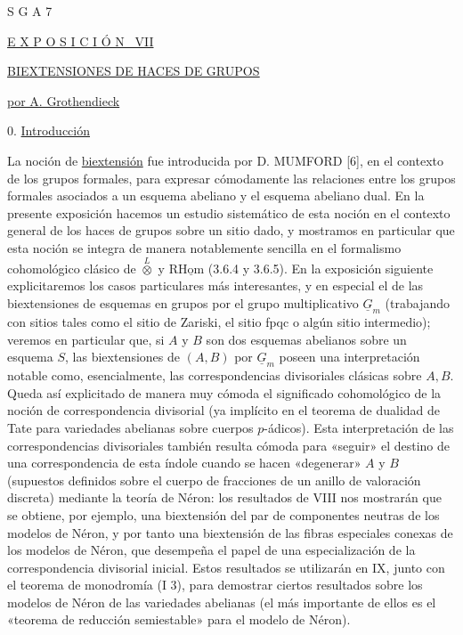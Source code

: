 


S G A 7


\underline{E X P O S I C I Ó N \ VII}


\underline{\underline{BIEXTENSIONES DE HACES DE GRUPOS}}


\underline{por A. Grothendieck}


0. \underline{Introducción}

La noción de \underline{biextensión} fue introducida por D. MUMFORD
[6], en el contexto de los grupos formales, para expresar cómodamente
las relaciones entre los grupos formales asociados a un esquema
abeliano y el esquema abeliano dual. En la presente exposición hacemos
un estudio sistemático de esta noción en el contexto general de los
haces de grupos sobre un sitio dado, y mostramos en particular que esta
noción se integra de manera notablemente sencilla en el formalismo
cohomológico clásico de $\overset{L}{\otimes}$ y
$\mathrm{R}\underline{\mathrm{Hom}}$ (3.6.4 y 3.6.5). En la exposición siguiente
explicitaremos los casos particulares más interesantes, y en especial
el de las biextensiones de esquemas en grupos por el grupo multiplicativo
$\underline{G}_{m}$ (trabajando con sitios tales como el sitio de
Zariski, el sitio fpqc o algún sitio intermedio); veremos en particular
que, si $A$ y $B$ son dos esquemas abelianos sobre un esquema $S$, las
biextensiones de $(A,B)$ por $\underline{G}_{m}$ poseen una
interpretación notable como, esencialmente, las correspondencias
divisoriales clásicas sobre $A,B$. Queda así explicitado de manera muy
cómoda el significado cohomológico de la noción de correspondencia
divisorial (ya implícito en el teorema de dualidad de Tate para
variedades abelianas sobre cuerpos $p$-ádicos). Esta interpretación de
las correspondencias divisoriales también resulta cómoda para «seguir»
el destino de una correspondencia de esta índole cuando se hacen
«degenerar»
$A$ y $B$ (supuestos definidos sobre el cuerpo de fracciones de un
anillo de valoración discreta) mediante la teoría de Néron: los
resultados de VIII nos mostrarán que se obtiene, por ejemplo, una
biextensión del par de componentes neutras de los modelos de Néron, y
por tanto una biextensión de las fibras especiales conexas de los
modelos de Néron, que desempeña el papel de una especialización de la
correspondencia divisorial inicial. Estos resultados se utilizarán en
IX, junto con el teorema de monodromía (I 3), para demostrar ciertos
resultados sobre los modelos de Néron de las variedades abelianas (el
más importante de ellos es el «teorema de reducción semiestable» para
el modelo de Néron).

